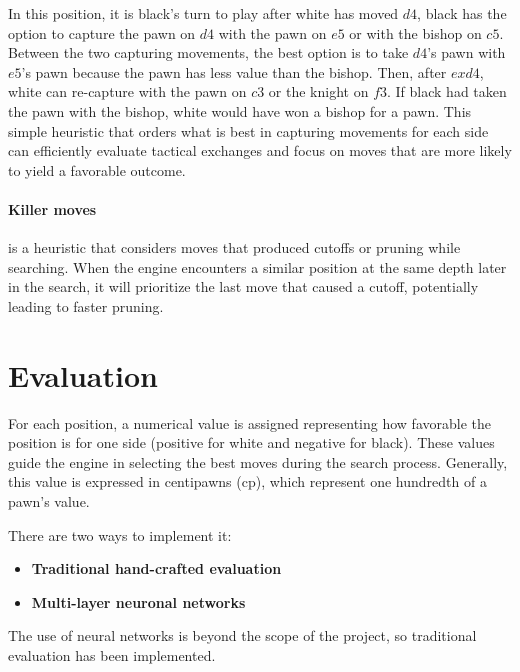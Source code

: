 \noindent In this position, it is black's turn to play after white has moved $d4$, black has the option to capture the pawn on $d4$ with the pawn on $e5$ or with the bishop on $c5$. Between the two capturing movements, the best option is to take $d4$'s pawn with $e5$'s pawn because the pawn has less value than the bishop. Then, after $exd4$, white can re-capture with the pawn on $c3$ or the knight on $f3$. If black had taken the pawn with the bishop, white would have won a bishop for a pawn. This simple heuristic that orders what is best in capturing movements for each side can efficiently evaluate tactical exchanges and focus on moves that are more likely to yield a favorable outcome.

\paragraph{Killer moves} is a heuristic that considers moves that produced cutoffs or pruning while searching. When the engine encounters a similar position at the same depth later in the search, it will prioritize the last move that caused a cutoff, potentially leading to faster pruning.

\section{Evaluation}

For each position, a numerical value is assigned representing how favorable the position is for one side (positive for white and negative for black). These values guide the engine in selecting the best moves during the search process. Generally, this value is expressed in centipawns (cp), which represent one hundredth of a pawn's value.

\vspace{1em}

\noindent There are two ways to implement it:

\begin{itemize}
    \item \textbf{Traditional hand-crafted evaluation}
    \item \textbf{Multi-layer neuronal networks}
\end{itemize}

\noindent The use of neural networks is beyond the scope of the project, so traditional evaluation has been implemented.

\vspace{1em}

